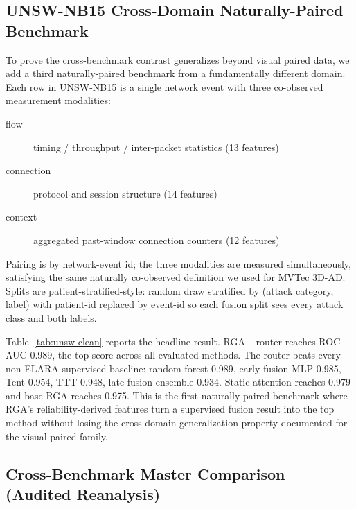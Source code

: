 \documentclass[10pt,conference]{IEEEtran}
\newcommand{\system}{ELARA}
\newcommand{\method}{RGA}
\newcommand{\methodplus}{RGA+}
\begin{document}
\subsection{UNSW-NB15 Cross-Domain Naturally-Paired Benchmark}
\label{sec:unsw-paired}

To prove the cross-benchmark contrast generalizes beyond visual paired
data, we add a third naturally-paired benchmark from a fundamentally
different domain. Each row in UNSW-NB15 is a single network event with
three co-observed measurement modalities:

\begin{description}
  \item[flow] timing / throughput / inter-packet statistics (13 features)
  \item[connection] protocol and session structure (14 features)
  \item[context] aggregated past-window connection counters (12 features)
\end{description}

Pairing is by network-event id; the three modalities are measured
simultaneously, satisfying the same naturally co-observed definition we
used for MVTec 3D-AD. Splits are patient-stratified-style: random
draw stratified by (attack category, label) with patient-id replaced by
event-id so each fusion split sees every attack class and both labels.


Table~\ref{tab:unsw-clean} reports the headline result. \methodplus{}
router reaches ROC-AUC 0.989, the top score across all evaluated
methods. The router beats every non-\system{} supervised baseline:
random forest 0.989, early fusion MLP 0.985, Tent 0.954, TTT 0.948,
late fusion ensemble 0.934. Static attention reaches 0.979 and base
\method{} reaches 0.975. This is the first naturally-paired benchmark
where \method{}'s reliability-derived features turn a supervised fusion
result into the top method without losing the cross-domain
generalization property documented for the visual paired family.

\subsection{Cross-Benchmark Master Comparison (Audited Reanalysis)}
\label{sec:cross-benchmark-master}
\end{document}
